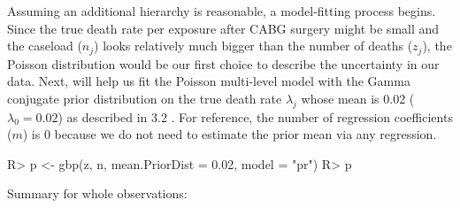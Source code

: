 \documentclass[article]{jss}
\begin{document}
Assuming an additional hierarchy is reasonable, a model-fitting process begins.  Since the true death rate per exposure after CABG surgery might be small and the caseload ($n_{j}$) looks relatively much bigger than the number of deaths ($z_{j}$), the Poisson distribution would be our first choice to describe the uncertainty in our data. Next,  will help us fit the Poisson multi-level model with the Gamma conjugate prior distribution on the true death rate $\lambda_{j}$ whose mean is 0.02 ($\lambda_{0}=0.02$) as described in 3.2 . For reference, the number of regression coefficients ($m$) is 0 because we do not need to estimate the prior mean via any regression.
\begin{CodeChunk}
\begin{CodeInput}
R> p <- gbp(z, n, mean.PriorDist = 0.02, model = "pr")
R> p
\end{CodeInput}
\begin{CodeOutput}
Summary for whole observations: 


\end{CodeOutput}
\end{CodeChunk}
\end{document}
